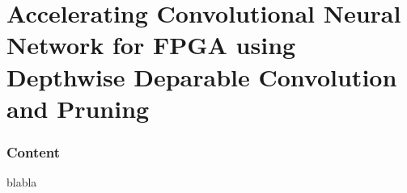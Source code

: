 \part{Accelerating Convolutional Neural Network for FPGA using Depthwise Deparable Convolution and Pruning}
\nopagebreak
\section*{Content}
blabla
\afterpage{\blankpage}
\newpage

\newpage

\afterpage{\blankpage}
\newpage